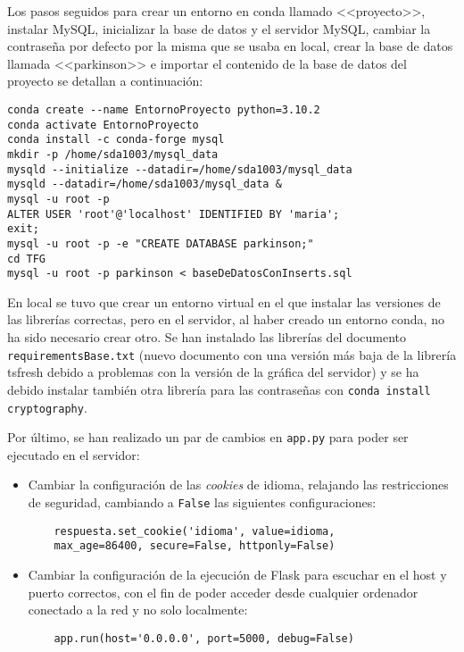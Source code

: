 Los pasos seguidos para crear un entorno en conda llamado <<proyecto>>, instalar MySQL, inicializar la base de datos y el servidor MySQL, cambiar la contraseña por defecto por la misma que se usaba en local, crear la base de datos llamada <<parkinson>> e importar el contenido de la base de datos del proyecto se detallan a continuación:
\begin{verbatim}
conda create --name EntornoProyecto python=3.10.2
conda activate EntornoProyecto
conda install -c conda-forge mysql
mkdir -p /home/sda1003/mysql_data
mysqld --initialize --datadir=/home/sda1003/mysql_data
mysqld --datadir=/home/sda1003/mysql_data &
mysql -u root -p
ALTER USER 'root'@'localhost' IDENTIFIED BY 'maria';
exit;
mysql -u root -p -e "CREATE DATABASE parkinson;"
cd TFG
mysql -u root -p parkinson < baseDeDatosConInserts.sql
\end{verbatim}

En local se tuvo que crear un entorno virtual en el que instalar las versiones de las librerías correctas, pero en el servidor, al haber creado un entorno conda, no ha sido necesario crear otro. Se han instalado las librerías del documento \texttt{requirementsBase.txt} (nuevo documento con una versión más baja de la librería tsfresh debido a problemas con la versión de la gráfica del servidor) y se ha debido instalar también otra librería para las contraseñas con \texttt{conda install cryptography}.


Por último, se han realizado un par de cambios en \texttt{app.py} para poder ser ejecutado en el servidor:
\begin{itemize}
    \item Cambiar la configuración de las \textit{cookies} de idioma, relajando las restricciones de seguridad, cambiando a \texttt{False} las siguientes configuraciones:
    \begin{verbatim}
    respuesta.set_cookie('idioma', value=idioma, 
    max_age=86400, secure=False, httponly=False)
    \end{verbatim}

    \item Cambiar la configuración de la ejecución de Flask para escuchar en el host y puerto correctos, con el fin de poder acceder desde cualquier ordenador conectado a la red y no solo localmente:
    \begin{verbatim}
    app.run(host='0.0.0.0', port=5000, debug=False)
    \end{verbatim}
\end{itemize}


